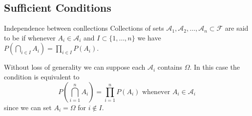 \documentclass[../main.tex]{subfiles}
\begin{document}
\subsection{Sufficient Conditions}

\begin{definition}{Independence between conllections}{}
    Collections of sets $\mathcal{A}_1, \mathcal{A}_2, \ldots, \mathcal{A}_n \subset \mathcal{F}$ are said to be  if whenever $A_i \in \mathcal{A}_i$ and $I \subset \{1, \ldots, n\}$ we have $P(\bigcap_{i \in I} A_i) = \prod_{i \in I} P(A_i)$.
\end{definition}

\begin{lemma}{}{}
Without loss of generality we can suppose each $\mathcal{A}_{i}$ contains $\Omega$. In this case the condition is equivalent to
\[
P \left(\bigcap_{i=1}^n A_i\right) = \prod_{i=1}^n P(A_i) \text{ whenever } A_i \in \mathcal{A}_i
\]
since we can set $A_i = \Omega$ for $i \notin I$.
\end{lemma}
\end{document}
